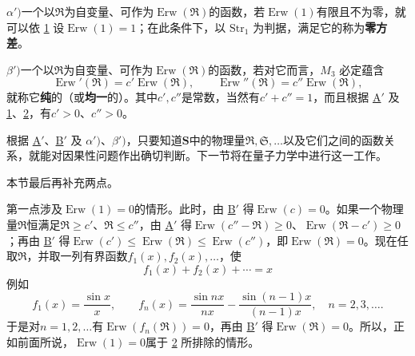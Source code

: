 \documentclass[fontsize=13pt,twoside,openany,headings=normal,parskip=false,bookmarkpackage=false,DIV=calc]{scrbook}
\begin{document}
\noindent{}$\alpha')$\label{def:IV.1.alphaprime}一个以$\mathfrak R$为自变量、可作为$\operatorname{Erw}(\mathfrak R)$的函数，若$\operatorname{Erw}(1)$有限且不为零，就可以依 \hyperref[remark:IV.1.1]{1} 设$\operatorname{Erw}(1)=1$；在此条件下，以 \hyperref[eq:IV.1.Str1]{$\mathrm{Str}_1$} 为判据，满足它的称为\textbf{零方差}。

\noindent{}$\beta')$\label{def:IV.1.betaprime}一个以$\mathfrak R$为自变量、可作为$\operatorname{Erw}(\mathfrak R)$的函数，若对它而言，\hyperref[eq:IV.1.M3]{$M_3$} 必定蕴含
\[
\operatorname{Erw}'(\mathfrak R)=c'\operatorname{Erw}(\mathfrak R),\qquad
\operatorname{Erw}''(\mathfrak R)=c''\operatorname{Erw}(\mathfrak R),
\]
就称它\textbf{纯}的（或\textbf{均一}的）。其中$c',\allowbreak c''$是常数，当然有$c'+c''=1$，而且根据 \hyperref[cond:IV.Aprime]{A$'$} 及 \hyperref[remark:IV.1.1]{1}、\hyperref[remark:IV.1.2]{2}，有$c'>0$、$c''>0$。

根据 \hyperref[cond:IV.Aprime]{A$'$}、\hyperref[cond:IV.Bprime]{B$'$} 及 \hyperref[def:IV.1.alphaprime]{$\alpha')$}、\hyperref[def:IV.1.betaprime]{$\beta')$}，只要知道$\boldsymbol{S}$中的物理量$\mathfrak R,\allowbreak \mathfrak S,\allowbreak \ldots$以及它们之间的函数关系，就能对因果性问题作出确切判断。下一节将在量子力学中进行这一工作。

本节最后再补充两点。

第一点涉及$\operatorname{Erw}(1)=0$的情形。此时，由 \hyperref[cond:IV.Bprime]{B$'$} 得$\operatorname{Erw}(c)=0$。如果一个物理量$\mathfrak R$恒满足$\mathfrak R\geq c'$、$\mathfrak R\leq c''$，由 \hyperref[cond:IV.Aprime]{A$'$} 得$\operatorname{Erw}(c''-\mathfrak R)\geq0$、$\operatorname{Erw}(\mathfrak R-c')\geq0$；再由 \hyperref[cond:IV.Bprime]{B$'$} 得$\operatorname{Erw}(c')\leq\operatorname{Erw}(\mathfrak R)\leq\operatorname{Erw}(c'')$，即$\operatorname{Erw}(\mathfrak R)=0$。现在任取$\mathfrak R$，并取一列有界函数$f_1(x),\allowbreak f_2(x),\allowbreak \ldots$，使
\[
f_1(x)+f_2(x)+\cdots=x
\]
例如
\[
f_1(x)=\frac{\sin x}{x},\qquad
f_n(x)=\frac{\sin nx}{nx}-\frac{\sin(n-1)x}{(n-1)x},\quad n=2,3,\ldots.
\]
于是对$n=1,\allowbreak 2,\allowbreak \ldots$有$\operatorname{Erw}(f_n(\mathfrak R))=0$，再由 \hyperref[cond:IV.Bprime]{B$'$} 得$\operatorname{Erw}(\mathfrak R)=0$。所以，正如前面所说，$\operatorname{Erw}(1)=0$属于 \hyperref[remark:IV.1.2]{2} 所排除的情形。
\end{document}
